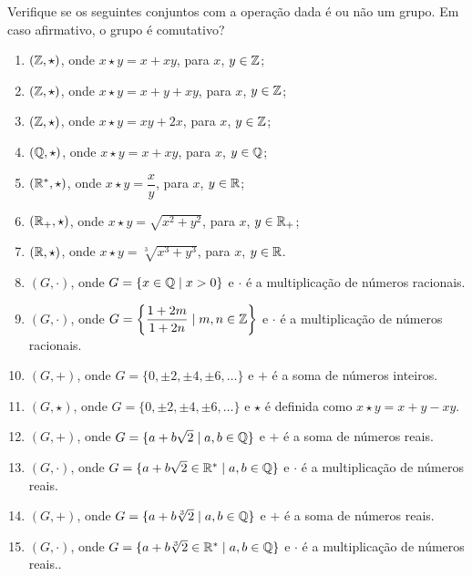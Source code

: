 \documentclass[12pt]{exam}
\begin{document}
    \questao{} Verifique se os seguintes conjuntos com a operação dada é ou não um grupo. Em caso afirmativo, o grupo é comutativo?
    \begin{enumerate}[label=({\alph*})]
        \item $(\mathbb{Z}, \star)$, onde $x \star y = x + xy$, para $x$, $y \in \mathbb{Z}$;

        \item $(\mathbb{Z}, \star)$, onde $x \star y = x + y + xy$, para $x$, $y \in \mathbb{Z}$;

        \item $(\mathbb{Z}, \star)$, onde $x \star y = xy + 2x$, para $x$, $y \in \mathbb{Z}$;

        \item $(\mathbb{Q}, \star)$, onde $x \star y = x + xy$, para $x$, $y \in \mathbb{Q}$;

        \item $(\mathbb{R}^*, \star)$, onde $x \star y = \dfrac{x}{y}$, para $x$, $y \in \mathbb{R}$;

        \item $(\mathbb{R}_+, \star)$, onde $x \star y = \sqrt{x^2 + y^2}$, para $x$, $y \in \mathbb{R}_+$;

        \item $(\mathbb{R}, \star)$, onde $x \star y = \sqrt[3]{x^3 + y^3}$, para $x$, $y \in \mathbb{R}$.

        \item $(G, \cdot)$, onde $G = \{x \in \mathbb{Q} \mid x > 0\}$ e $\cdot$ é a multiplicação de números racionais.

        \item $(G, \cdot)$, onde $G = \left\{\dfrac{1 + 2m}{1 + 2n} \mid m, n \in \mathbb{Z}\right\}$ e $\cdot$ é a multiplicação de números racionais.

        \item $(G, +)$, onde $G = \{0, \pm 2, \pm 4, \pm 6, \dots\}$ e $+$ é a soma de números inteiros.

        \item $(G, \star)$, onde $G = \{0, \pm 2, \pm 4, \pm 6, \dots\}$ e $\star$ é definida como $x \star y = x + y - xy$.

        \item $(G, +)$, onde $G = \{a + b\sqrt{2} \mid a, b \in \mathbb{Q}\}$ e $+$ é a soma de números reais.

        \item $(G, \cdot)$, onde $G = \{a + b\sqrt{2} \in \mathbb{R}^* \mid a, b \in \mathbb{Q}\}$ e $\cdot$ é a multiplicação de números reais.

        \item $(G, +)$, onde $G = \{a + b\sqrt[3]{2} \mid a, b \in \mathbb{Q}\}$ e $+$ é a soma de números reais.

        \item $(G, \cdot)$, onde $G = \{a + b\sqrt[3]{2} \in \mathbb{R}^* \mid a, b \in \mathbb{Q}\}$ e $\cdot$ é a multiplicação de números reais..
    \end{enumerate}
\end{document}
